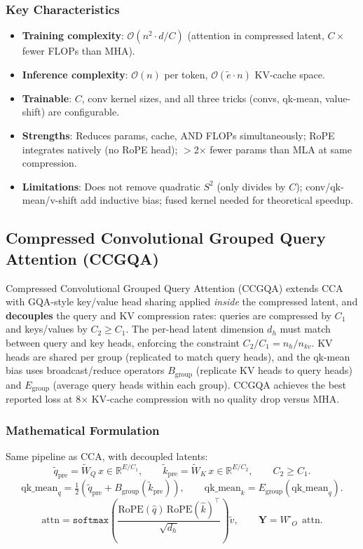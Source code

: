 \subsubsection{Key Characteristics}
\begin{itemize}[leftmargin=*]
    \item \textbf{Training complexity}: $\mathcal{O}(n^2 \cdot d / C)$ (attention in compressed latent, $C{\times}$ fewer FLOPs than MHA).
    \item \textbf{Inference complexity}: $\mathcal{O}(n)$ per token, $\mathcal{O}(\tilde{e} \cdot n)$ KV-cache space.
    \item \textbf{Trainable}: $C$, conv kernel sizes, and all three tricks (convs, qk-mean, value-shift) are configurable.
    \item \textbf{Strengths}: Reduces params, cache, AND FLOPs simultaneously; RoPE integrates natively (no RoPE head); $>$2$\times$ fewer params than MLA at same compression.
    \item \textbf{Limitations}: Does not remove quadratic $S^2$ (only divides by $C$); conv/qk-mean/v-shift add inductive bias; fused kernel needed for theoretical speedup.
\end{itemize}

\subsection{Compressed Convolutional Grouped Query Attention (CCGQA)}
Compressed Convolutional Grouped Query Attention (CCGQA) \citep{figliola_cca_2025} extends CCA with GQA-style key/value head sharing applied \emph{inside} the compressed latent, and \textbf{decouples} the query and KV compression rates: queries are compressed by $C_1$ and keys/values by $C_2 \geq C_1$. The per-head latent dimension $d_h$ must match between query and key heads, enforcing the constraint $C_2 / C_1 = n_h / n_{kv}$. KV heads are shared per group (replicated to match query heads), and the qk-mean bias uses broadcast/reduce operators $B_{\text{group}}$ (replicate KV heads to query heads) and $E_{\text{group}}$ (average query heads within each group). CCGQA achieves the best reported loss at 8$\times$ KV-cache compression with no quality drop versus MHA.

\subsubsection{Mathematical Formulation}
Same pipeline as CCA, with decoupled latents:
\[
\tilde{q}_{\text{pre}} = \tilde{W}_Q\, x \in \mathbb{R}^{E/C_1}, \qquad
\tilde{k}_{\text{pre}} = \tilde{W}_K\, x \in \mathbb{R}^{E/C_2}, \qquad C_2 \geq C_1.
\]
\[
\text{qk\_mean}_q = \tfrac{1}{2}(\tilde{q}_{\text{pre}} + B_{\text{group}}(\tilde{k}_{\text{pre}})), \qquad
\text{qk\_mean}_k = E_{\text{group}}(\text{qk\_mean}_q).
\]
\[
\text{attn} = \texttt{softmax}\!\left(\frac{\text{RoPE}(\hat{q})\, \text{RoPE}(\hat{k})^\top}{\sqrt{d_h}}\right) \tilde{v}, \qquad
\mathbf{Y} = W̃_O\, \text{attn}.
\]

